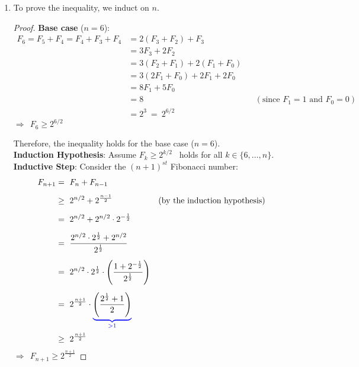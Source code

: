 \documentclass[twoside,11pt]{homework}
\begin{document}
\begin{enumerate}[\bf (a)]

\item 
To prove the inequality, we induct on $n$.
\begin{proof}
\textbf{Base case} ($n = 6$):  
\begin{align*}
F_6 = F_5 + F_4 = F_4 + F_3 + F_4 & = 2(F_3 + F_2) + F_3 \\
& = 3F_3 + 2F_2 \\
& = 3(F_2 + F_1) + 2(F_1 + F_0) \\
& = 3(2F_1 + F_0) + 2F_1 + 2F_0 \\
& = 8F_1 + 5F_0 \\
& = 8  &&  (\text{since $F_1 = 1$ and $F_0 = 0$}) \\
& = 2^3 \ = \ 2^{6/2}
\end{align*}
$\Longrightarrow \ \ F_6 \geq 2^{6/2}$

Therefore,  the inequality holds for the base case ($n = 6$). \\

\textbf{Induction Hypothesis}: Assume $F_k \geq 2^{k/2}$ \ holds for all $k \in \{6, \dots, n\}$. \\

\textbf{Inductive Step}: Consider the $(n+1)^{st}$ Fibonacci number:
\begin{align*}
F_{n+1} & = \ F_n + F_{n-1} \\[0.4em]
& \geq \ 2^{n/2} + 2^{\frac{n-1}{2}} &&  (\text{by the induction hypothesis}) \\[0.5em]
& = \ 2^{n/2} + 2^{n/2} \cdot 2^{-\frac{1}{2}} \\[0.5em]
& = \ \frac{2^{n/2} \cdot 2^{\frac{1}{2}} + 2^{n/2}}{2^{\frac{1}{2}}} \\[0.5em]
& = \ 2^{n/2} \cdot 2^{\frac{1}{2}} \cdot \left( \frac{1+2^{-\frac{1}{2}}}{2^{\frac{1}{2}}} \right) \\[0.5em]
& = \ 2^{\frac{n+1}{2}} \cdot {\color{blue} \underbrace{\color{black} \left(\frac{2^{\frac{1}{2}} + 1}{2} \right)}_{> 1}} \\[0.1em]
& \geq \ 2^{\frac{n+1}{2}}
\end{align*}
$\Longrightarrow \ \ F_{n+1} \geq 2^{\frac{n+1}{2}}$

\end{proof}





\end{enumerate}
\end{document}
